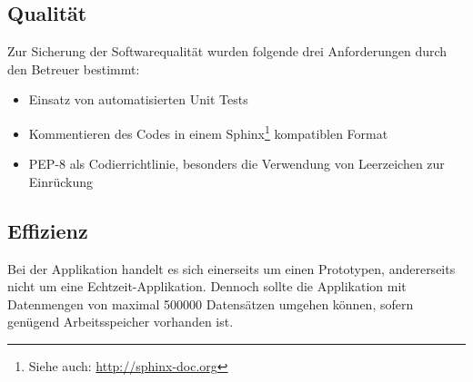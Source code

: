 \subsection{Qualität}
Zur Sicherung der Softwarequalität wurden folgende drei Anforderungen durch den Betreuer bestimmt:

\begin{itemize}
	\item Einsatz von automatisierten Unit Tests
	\item Kommentieren des Codes in einem Sphinx\footnote{Siehe auch: \url{http://sphinx-doc.org}} kompatiblen Format
	\item PEP-8 als Codierrichtlinie, besonders die Verwendung von Leerzeichen zur Einrückung
\end{itemize}


\subsection{Effizienz}
Bei der Applikation handelt es sich einerseits um einen Prototypen, andererseits nicht um eine Echtzeit-Applikation. Dennoch sollte die Applikation mit Datenmengen von maximal 500000 Datensätzen umgehen können, sofern genügend Arbeitsspeicher vorhanden ist.




